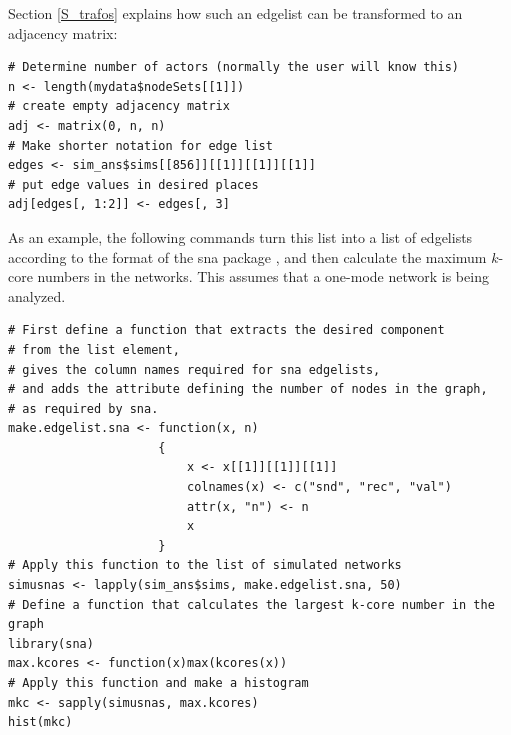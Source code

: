 \documentclass[a4paper,fleqn,11pt]{article}
\newcommand{\+}{\, + \,}
\begin{document}
Section \ref{S_trafos} explains how such an edgelist can be
transformed to an adjacency matrix:
\begin{verbatim}
# Determine number of actors (normally the user will know this)
n <- length(mydata$nodeSets[[1]])
# create empty adjacency matrix
adj <- matrix(0, n, n)
# Make shorter notation for edge list
edges <- sim_ans$sims[[856]][[1]][[1]][[1]]
# put edge values in desired places
adj[edges[, 1:2]] <- edges[, 3]
\end{verbatim}

As an example, the following commands turn this list into
a list of edgelists according to the format of the \textsf{sna} package
\citep{Butts08}, and then calculate the maximum $k$-core numbers
in the networks.
This assumes that a one-mode network is being analyzed.
\begin{verbatim}
# First define a function that extracts the desired component
# from the list element,
# gives the column names required for sna edgelists,
# and adds the attribute defining the number of nodes in the graph,
# as required by sna.
make.edgelist.sna <- function(x, n)
                     {
                         x <- x[[1]][[1]][[1]]
                         colnames(x) <- c("snd", "rec", "val")
                         attr(x, "n") <- n
                         x
                     }
# Apply this function to the list of simulated networks
simusnas <- lapply(sim_ans$sims, make.edgelist.sna, 50)
# Define a function that calculates the largest k-core number in the graph
library(sna)
max.kcores <- function(x)max(kcores(x))
# Apply this function and make a histogram
mkc <- sapply(simusnas, max.kcores)
hist(mkc)
\end{verbatim}

\end{document}
